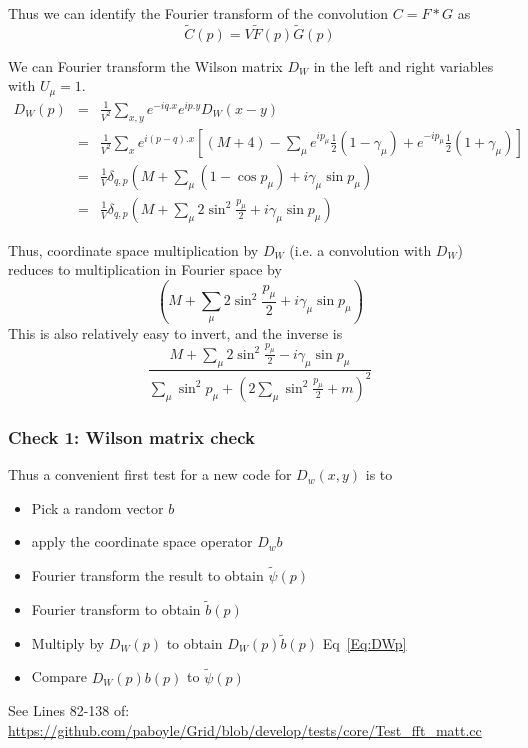\documentclass[letter,10pt]{report}
\begin{document}
Thus we can identify the Fourier transform of the convolution $C = F \ast G$ as
$$\tilde{C}(p)=V \tilde{F}(p) \tilde{G}(p)$$

We can Fourier transform the Wilson matrix $D_W$ in the left and right variables with $U_\mu=1$.
\begin{eqnarray}
  D_W(p)
  &=&  
\frac{1}{V^2}  \sum\limits_{x,y} e^{-i q.x}e^{i p.y} D_W(x-y)\\
  &=& 
\frac{1}{V^2}
\sum\limits_{x}
e^{i(p-q).x} \left[ (M+4) - \sum_\mu
e^{ip_\mu} \frac{1}{2}(1-\gamma_\mu)
+e^{-ip_\mu} \frac{1}{2}(1+\gamma_\mu) \right]\\
  &=& 
\frac{1}{V}\delta_{q,p} \left( M + \sum_\mu (1-\cos p_\mu) + i \gamma_\mu \sin p_\mu \right)\\
  &=& 
  \label{Eq:DWp}
\frac{1}{V}
\delta_{q,p} \left( M + \sum_\mu 2 \sin^2 \frac{p_\mu}{2} + i \gamma_\mu \sin p_\mu \right)
\end{eqnarray}

Thus, coordinate space multiplication by $D_W$ (i.e. a convolution with $D_W$) reduces to multiplication in Fourier space by
$$
\left( M + \sum_\mu 2 \sin^2 \frac{p_\mu}{2} + i \gamma_\mu \sin p_\mu \right)
$$
This is also relatively easy to invert, and the inverse is
$$
\frac{M+\sum_\mu  2 \sin^2 \frac{p_\mu}{2} -i \gamma_\mu \sin p_\mu }{ \sum_\mu \sin^2 p_\mu + (2 \sum_\mu \sin^2 \frac{p_\mu}{2} + m)^2 }
$$

\subsubsection{Check 1: Wilson matrix check}

Thus a convenient first test for a new code for $D_w(x,y)$ is to
\begin{itemize}
  \item Pick a random vector $b$
  \item apply the coordinate space operator $D_w b$
  \item Fourier transform the result to obtain $\tilde{\psi}(p)$
  \item Fourier transform to obtain $\tilde{b}(p)$
  \item Multiply by $D_W(p)$ to obtain $D_W(p) \tilde{b}(p)$ Eq~\ref{Eq:DWp}
  \item Compare $ D_W(p) b(p)$ to $\tilde{\psi}(p)$
\end{itemize}

See Lines 82-138 of:
\href{https://github.com/paboyle/Grid/blob/develop/tests/core/Test\_fft\_matt.cc}{https://github.com/paboyle/Grid/blob/develop/tests/core/Test\_fft\_matt.cc}
\end{document}
